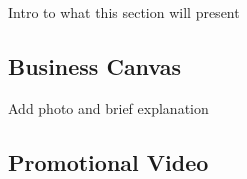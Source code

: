 Intro to what this section will present

\subsection{Business Canvas}
Add photo and brief explanation

\subsection{Promotional Video}